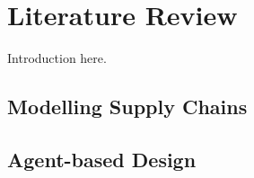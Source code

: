 \section{Literature Review}

Introduction here.

\subsection{Modelling Supply Chains}

\subsection{Agent-based Design}



